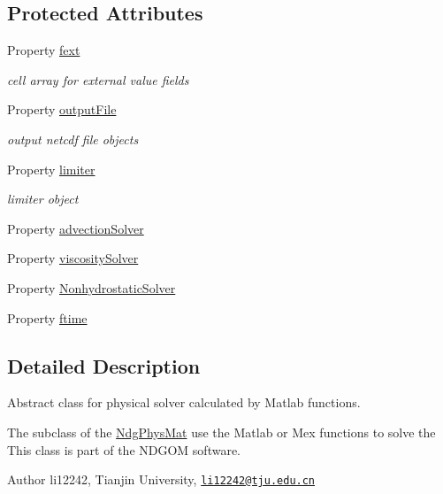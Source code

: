 \subsection*{Protected Attributes}
\begin{DoxyCompactItemize}
\item 
Property \hyperlink{class_ndg_phys_mat_a2b0e8a77bf5f6fe870b12e400d6d83f3}{fext}
\begin{DoxyCompactList}\small\item\em cell array for external value fields \end{DoxyCompactList}\item 
Property \hyperlink{class_ndg_phys_mat_aac9e4a524cf327bce5a9cf043d63e9fa}{output\+File}
\begin{DoxyCompactList}\small\item\em output netcdf file objects \end{DoxyCompactList}\item 
Property \hyperlink{class_ndg_phys_mat_a79954842dc82684b2e62b0c6687ff247}{limiter}
\begin{DoxyCompactList}\small\item\em limiter object \end{DoxyCompactList}\item 
Property \hyperlink{class_ndg_phys_mat_abafee66894944bfe7dbb7bc5eac5f0b6}{advection\+Solver}
\item 
Property \hyperlink{class_ndg_phys_mat_a5b92d892d770769a1bfe205d95149c59}{viscosity\+Solver}
\item 
Property \hyperlink{class_ndg_phys_mat_a7e127b3884311d8faef84b425f570d02}{Nonhydrostatic\+Solver}
\item 
Property \hyperlink{class_ndg_phys_mat_ae2721157276963112176bd9f233ee241}{ftime}
\end{DoxyCompactItemize}


\subsection{Detailed Description}
Abstract class for physical solver calculated by Matlab functions. 

The subclass of the \hyperlink{class_ndg_phys_mat}{Ndg\+Phys\+Mat} use the Matlab or Mex functions to solve the This class is part of the N\+D\+G\+OM software. \begin{DoxyAuthor}{Author}
li12242, Tianjin University, \href{mailto:li12242@tju.edu.cn}{\tt li12242@tju.\+edu.\+cn} 
\end{DoxyAuthor}



